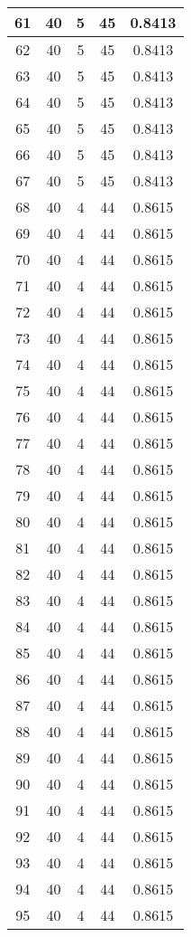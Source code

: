 \documentclass[letterpaper, 12pt]{article}
\begin{document}
\begin{longtable}{|c|c|c|c|c|}
61 & 40 & 5 & 45 & 0.8413 \\
\hline
62 & 40 & 5 & 45 & 0.8413 \\
\hline
63 & 40 & 5 & 45 & 0.8413 \\
\hline
64 & 40 & 5 & 45 & 0.8413 \\
\hline
65 & 40 & 5 & 45 & 0.8413 \\
\hline
66 & 40 & 5 & 45 & 0.8413 \\
\hline
67 & 40 & 5 & 45 & 0.8413 \\
\hline
68 & 40 & 4 & 44 & 0.8615 \\
\hline
69 & 40 & 4 & 44 & 0.8615 \\
\hline
70 & 40 & 4 & 44 & 0.8615 \\
\hline
71 & 40 & 4 & 44 & 0.8615 \\
\hline
72 & 40 & 4 & 44 & 0.8615 \\
\hline
73 & 40 & 4 & 44 & 0.8615 \\
\hline
74 & 40 & 4 & 44 & 0.8615 \\
\hline
75 & 40 & 4 & 44 & 0.8615 \\
\hline
76 & 40 & 4 & 44 & 0.8615 \\
\hline
77 & 40 & 4 & 44 & 0.8615 \\
\hline
78 & 40 & 4 & 44 & 0.8615 \\
\hline
79 & 40 & 4 & 44 & 0.8615 \\
\hline
80 & 40 & 4 & 44 & 0.8615 \\
\hline
81 & 40 & 4 & 44 & 0.8615 \\
\hline
82 & 40 & 4 & 44 & 0.8615 \\
\hline
83 & 40 & 4 & 44 & 0.8615 \\
\hline
84 & 40 & 4 & 44 & 0.8615 \\
\hline
85 & 40 & 4 & 44 & 0.8615 \\
\hline
86 & 40 & 4 & 44 & 0.8615 \\
\hline
87 & 40 & 4 & 44 & 0.8615 \\
\hline
88 & 40 & 4 & 44 & 0.8615 \\
\hline
89 & 40 & 4 & 44 & 0.8615 \\
\hline
90 & 40 & 4 & 44 & 0.8615 \\
\hline
91 & 40 & 4 & 44 & 0.8615 \\
\hline
92 & 40 & 4 & 44 & 0.8615 \\
\hline
93 & 40 & 4 & 44 & 0.8615 \\
\hline
94 & 40 & 4 & 44 & 0.8615 \\
\hline
95 & 40 & 4 & 44 & 0.8615 \\

\end{longtable}
\end{document}
